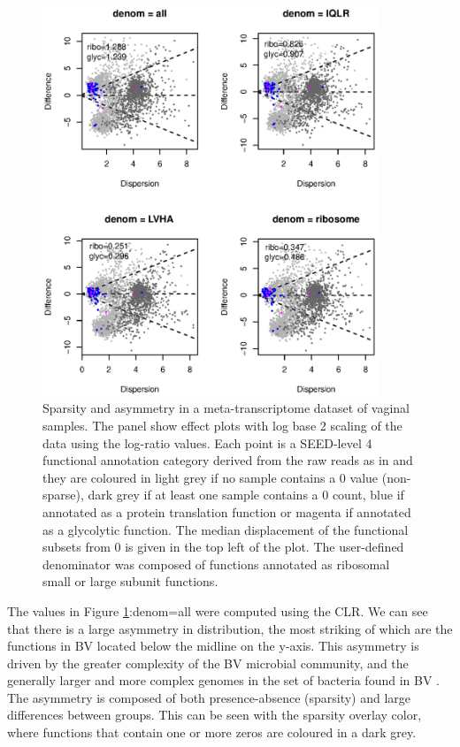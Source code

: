 \documentclass[graybox]{svmult}
\begin{document}
%
\begin{figure}[!b]
\sidecaption[t]
\includegraphics[width=10cm]{MAx4-book.eps}
%
%
\caption{Sparsity and asymmetry in a meta-transcriptome dataset of vaginal samples.  The panel show effect plots with log base 2 scaling of the data using the log-ratio values. Each point is a SEED-level 4 functional annotation category derived from the raw reads as in \cite{Macklaim:2018aa} and they are coloured in light grey if no sample contains a 0 value (non-sparse), dark grey if at least one sample contains a 0 count, blue if annotated as a protein translation function or magenta if annotated as a glycolytic function. The median displacement of the functional subsets from 0 is given in the top left of the plot.  The user-defined denominator was composed of functions annotated as ribosomal small or large subunit functions.  }
\label{Fig:f3a}       %
\end{figure}

  
The values in Figure \ref{Fig:f3a}:denom=all were computed using the CLR. We can see that there is a large asymmetry in distribution, the most striking of which are the functions in BV located below the midline on the y-axis. This asymmetry is driven by the greater complexity of the BV microbial community, and the generally larger and more complex genomes in the set of bacteria found in BV \cite{macklaim:2013}. The asymmetry is composed of both presence-absence (sparsity) and large differences between groups. This can be seen with the sparsity overlay color, where functions that contain one or more zeros are coloured in a dark grey. 
\end{document}
